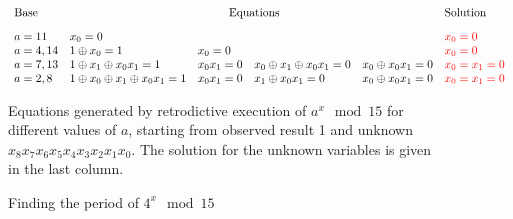 \documentclass{article}
\newcommand{\red}[1]{{\color{red}{#1}}}
\begin{document}
\begin{refsection}
\begin{figure}
\[\begin{array}{l@{\quad}lllll}
\textrm{Base} & \multicolumn{4}{c}{\textrm{Equations}} & \textrm{Solution} \\[2ex]
a=11 & x_0 = 0 &&&& \red{x_0 = 0} \\
a=4,14 & 1 \oplus x_0 = 1 & x_0 = 0 &&
  & \red{x_0 = 0} \\
a=7,13 & 1 \oplus x_1 \oplus x_0x_1 = 1 & x_0x_1 = 0 & x_0 \oplus x_1 \oplus x_0x_1 = 0 &  x_0 \oplus x_0x_1 = 0 & \red{x_0=x_1=0} \\
a=2,8 & 1 \oplus x_0 \oplus x_1 \oplus x_0x_1 = 1 & x_0x_1 = 0 & x_1 \oplus x_0x_1 = 0 & x_0 \oplus x_0x_1 = 0  & \red{x_0=x_1=0}
\end{array}\]
\caption{\label{fig:shor-eqs}Equations generated by retrodictive
  execution of $a^x \mod{15}$ for different values of $a$, starting
  from observed result 1 and unknown
  $x_8x_7x_6x_5x_4x_3x_2x_1x_0$. The solution for the unknown
  variables is given in the last column.}
\end{figure}
\begin{wrapfigure}{r}{7cm}
\begin{center}
\end{center}
\caption{\label{fig:shor15}Finding the period of $4^x \mod{15}$}
\end{wrapfigure}

\end{refsection}
\end{document}
